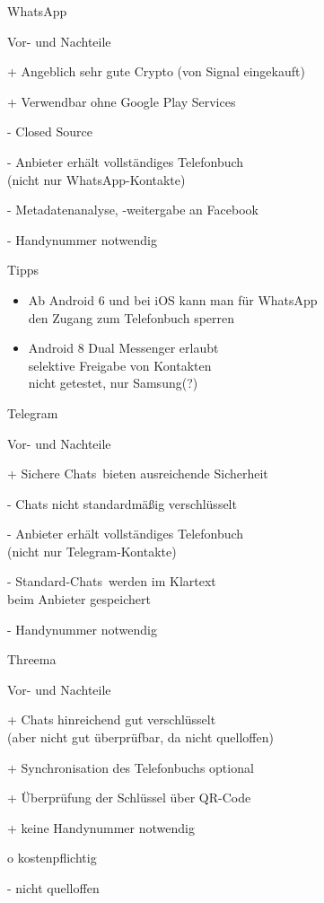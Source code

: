 
\begin{frame}{WhatsApp}
\begin{blex}{Vor- und Nachteile}
\item[+] Angeblich sehr gute Crypto (von Signal eingekauft)
\item[+] Verwendbar ohne Google Play Services
\item[-] Closed Source
\item[-] Anbieter erhält vollständiges Telefonbuch\\
  (nicht nur WhatsApp-Kontakte)
\item[-] Metadatenanalyse, -weitergabe an Facebook
\item[-] Handynummer notwendig
\end{blex}
\begin{block}{Tipps}
  \begin{itemize}
    \item Ab Android 6 und bei iOS kann man für WhatsApp\\den Zugang zum Telefonbuch sperren
    \item Android 8 Dual Messenger erlaubt\\selektive Freigabe von Kontakten\\
      \scriptsize nicht getestet, nur Samsung(?) 
  \end{itemize}
\end{block}
\end{frame}

\begin{frame}{Telegram}
\begin{blex}{Vor- und Nachteile}
\item[+] \glqq Sichere Chats\grqq\ bieten ausreichende Sicherheit
\item[-] Chats nicht standardmäßig verschlüsselt
\item[-] Anbieter erhält vollständiges Telefonbuch\\ (nicht nur Telegram-Kontakte)
\item[-] \glqq Standard-Chats\grqq\ werden im Klartext\\beim Anbieter gespeichert
\item[-] Handynummer notwendig
\end{blex}
\end{frame}

\begin{frame}{Threema}
\begin{blex}{Vor- und Nachteile}
\item[+] Chats hinreichend gut verschlüsselt\\(aber nicht gut überprüfbar, da nicht quelloffen)
\item[+] Synchronisation des Telefonbuchs optional
\item[+] Überprüfung der Schlüssel über QR-Code
\item[+] keine Handynummer notwendig
\item[o] kostenpflichtig
\item[-] nicht quelloffen
\end{blex}
\end{frame}

